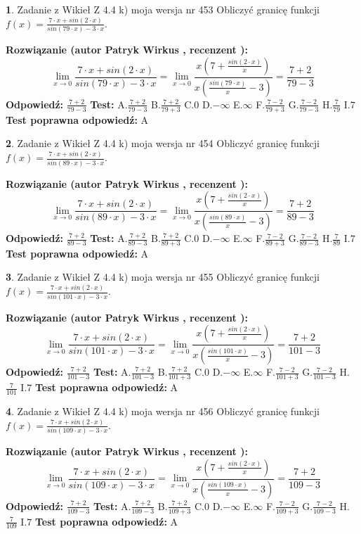 \documentclass[12pt, a4paper]{article}
\theoremstyle{definition} %
\newtheorem{zad}{}
\newcommand{\zadStart}[1]{\begin{zad}#1\newline}
\newcommand{\zadStop}{\end{zad}}
\newcommand{\rozwStart}[2]{\noindent \textbf{Rozwiązanie (autor #1 , recenzent #2): }\newline}
\newcommand{\rozwStop}{\newline}
\newcommand{\odpStart}{\noindent \textbf{Odpowiedź:}\newline}
\newcommand{\odpStop}{\newline}
\newcommand{\testStart}{\noindent \textbf{Test:}\newline}
\newcommand{\testStop}{\newline}
\newcommand{\kluczStart}{\noindent \textbf{Test poprawna odpowiedź:}\newline}
\newcommand{\kluczStop}{\newline}
\begin{document}
\zadStart{Zadanie z Wikieł Z 4.4 k) moja wersja nr 453}
Obliczyć granicę funkcji $f(x)=\frac{7\cdot x +sin(2\cdot x)}{sin(79\cdot x) -3\cdot x}$.
\zadStop
\rozwStart{Patryk Wirkus}{}
$$\lim\limits_{x\to 0}\frac{7\cdot x +sin(2\cdot x)}{sin(79\cdot x) -3\cdot x}
=\lim\limits_{x\to 0}\frac{x(7+\frac{sin(2\cdot x)}{x})}{x(\frac{sin(79\cdot x)}{x}-3)}
=\frac{7+2}{79-3}$$
\rozwStop
\odpStart
$\frac{7+2}{79-3}$
\odpStop
\testStart
A.$\frac{7+2}{79-3}$
B.$\frac{7+2}{79+3}$
C.$0$
D.$-\infty$
E.$\infty$
F.$\frac{7-2}{79+3}$
G.$\frac{7-2}{79-3}$
H.$\frac{7}{79}$
I.$7$
\testStop
\kluczStart
A
\kluczStop



\zadStart{Zadanie z Wikieł Z 4.4 k) moja wersja nr 454}
Obliczyć granicę funkcji $f(x)=\frac{7\cdot x +sin(2\cdot x)}{sin(89\cdot x) -3\cdot x}$.
\zadStop
\rozwStart{Patryk Wirkus}{}
$$\lim\limits_{x\to 0}\frac{7\cdot x +sin(2\cdot x)}{sin(89\cdot x) -3\cdot x}
=\lim\limits_{x\to 0}\frac{x(7+\frac{sin(2\cdot x)}{x})}{x(\frac{sin(89\cdot x)}{x}-3)}
=\frac{7+2}{89-3}$$
\rozwStop
\odpStart
$\frac{7+2}{89-3}$
\odpStop
\testStart
A.$\frac{7+2}{89-3}$
B.$\frac{7+2}{89+3}$
C.$0$
D.$-\infty$
E.$\infty$
F.$\frac{7-2}{89+3}$
G.$\frac{7-2}{89-3}$
H.$\frac{7}{89}$
I.$7$
\testStop
\kluczStart
A
\kluczStop



\zadStart{Zadanie z Wikieł Z 4.4 k) moja wersja nr 455}
Obliczyć granicę funkcji $f(x)=\frac{7\cdot x +sin(2\cdot x)}{sin(101\cdot x) -3\cdot x}$.
\zadStop
\rozwStart{Patryk Wirkus}{}
$$\lim\limits_{x\to 0}\frac{7\cdot x +sin(2\cdot x)}{sin(101\cdot x) -3\cdot x}
=\lim\limits_{x\to 0}\frac{x(7+\frac{sin(2\cdot x)}{x})}{x(\frac{sin(101\cdot x)}{x}-3)}
=\frac{7+2}{101-3}$$
\rozwStop
\odpStart
$\frac{7+2}{101-3}$
\odpStop
\testStart
A.$\frac{7+2}{101-3}$
B.$\frac{7+2}{101+3}$
C.$0$
D.$-\infty$
E.$\infty$
F.$\frac{7-2}{101+3}$
G.$\frac{7-2}{101-3}$
H.$\frac{7}{101}$
I.$7$
\testStop
\kluczStart
A
\kluczStop



\zadStart{Zadanie z Wikieł Z 4.4 k) moja wersja nr 456}
Obliczyć granicę funkcji $f(x)=\frac{7\cdot x +sin(2\cdot x)}{sin(109\cdot x) -3\cdot x}$.
\zadStop
\rozwStart{Patryk Wirkus}{}
$$\lim\limits_{x\to 0}\frac{7\cdot x +sin(2\cdot x)}{sin(109\cdot x) -3\cdot x}
=\lim\limits_{x\to 0}\frac{x(7+\frac{sin(2\cdot x)}{x})}{x(\frac{sin(109\cdot x)}{x}-3)}
=\frac{7+2}{109-3}$$
\rozwStop
\odpStart
$\frac{7+2}{109-3}$
\odpStop
\testStart
A.$\frac{7+2}{109-3}$
B.$\frac{7+2}{109+3}$
C.$0$
D.$-\infty$
E.$\infty$
F.$\frac{7-2}{109+3}$
G.$\frac{7-2}{109-3}$
H.$\frac{7}{109}$
I.$7$
\testStop
\kluczStart
A
\kluczStop
\end{document}
